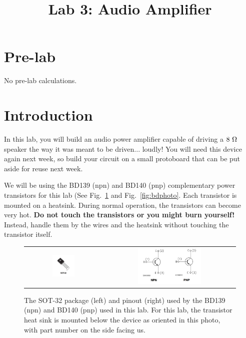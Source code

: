 \documentclass[12pt]{article}
\begin{document}

\title{Lab 3: Audio Amplifier}

\maketitle

\section{Pre-lab}

No pre-lab calculations.

\section{Introduction}

In this lab, you will build an audio power amplifier capable of driving a $8~\rm \Omega$ speaker the way it was meant to be driven... loudly!  You will need this device again next week, so build your circuit on a small protoboard that can be put aside for reuse next week.

We will be using the BD139 (npn) and BD140 (pnp) complementary power transistors for this lab (See Fig.~\ref{fig:bdpackage} and Fig.~\ref{fig:bdphoto}.  Each transistor is mounted on a heatsink.  During normal operation, the transistors can become very hot.  {\bf Do not touch the transistors or you might burn yourself!}  Instead, handle them by the wires and the heatsink without touching the transistor itself.

\begin{figure}[htbp]
\begin{center}
\begin{tabular}{cc}
\includegraphics[width=0.30\textwidth]{figs/bd139140_package.png} &
\includegraphics[width=0.50\textwidth]{figs/bd139140_pinout.png} \\
\end{tabular}
\end{center}
\caption{The SOT-32 package (left) and pinout (right) used by the BD139 (npn) and BD140 (pnp) used in this lab.  For this lab, the transistor heat sink is mounted below the device as oriented in this photo, with part number on the side facing us.}
\label{fig:bdpackage}
\end{figure}
\end{document}
